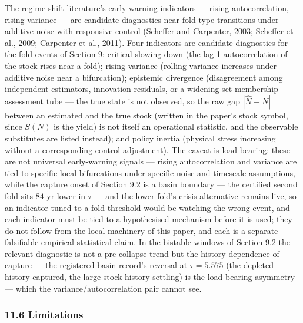 \documentclass[11pt]{article}
\begin{document}
The regime-shift literature's early-warning indicators --- rising
autocorrelation, rising variance --- are candidate diagnostics near
fold-type transitions under additive noise with responsive control
(Scheffer and Carpenter, 2003; Scheffer et al., 2009; Carpenter et al.,
2011). Four indicators are candidate diagnostics for the fold events of
Section 9: critical slowing down (the lag-1 autocorrelation of the stock
rises near a fold); rising variance (rolling variance increases under
additive noise near a bifurcation); epistemic divergence (disagreement
among independent estimators, innovation residuals, or a widening
set-membership assessment tube --- the true state is not observed, so
the raw gap \(|\hat N - N|\) between an estimated and the true stock
(written in the paper's stock symbol, since \(S(N)\) is the yield) is
not itself an operational statistic, and the observable substitutes are
listed instead); and policy inertia (physical stress increasing without
a corresponding control adjustment). The caveat is load-bearing: these
are not universal early-warning signals --- rising autocorrelation and
variance are tied to specific local bifurcations under specific noise
and timescale assumptions, while the capture onset of Section 9.2 is a
basin boundary --- the certified second fold sits \(84\) yr lower in
\(\tau\) --- and the lower fold's crisis alternative remains live, so an
indicator tuned to a fold threshold would be watching the wrong event,
and each indicator must be tied to a hypothesised mechanism before it is
used; they do not follow from the local machinery of this paper, and
each is a separate falsifiable empirical-statistical claim. In the
bistable windows of Section 9.2 the relevant diagnostic is not a
pre-collapse trend but the history-dependence of capture --- the
registered basin record's reversal at \(\tau = 5.575\) (the depleted
history captured, the large-stock history settling) is the load-bearing
asymmetry --- which the variance/autocorrelation pair cannot see.

\subsubsection{11.6 Limitations}\label{limitations}
\end{document}
